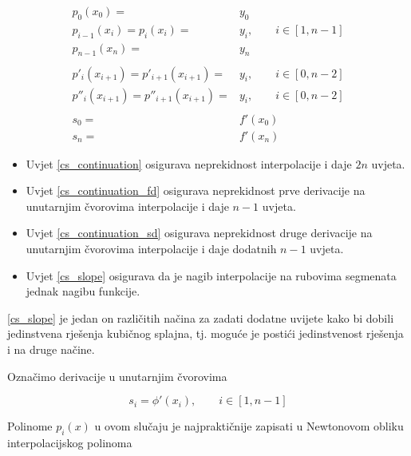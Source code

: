 \begin{conditionbox}
    \begin{align}
        p_0(x_0) =& y_0\nonumber\\
        \label{cs_continuation}
        p_{i-1}(x_i) = p_i(x_i) =& y_i,\qquad i\in[1,n-1]\\
        p_{n-1}(x_n) =& y_n\nonumber\\\nonumber\\
        \label{cs_continuation_fd}
        p'_{i}(x_{i+1}) = p'_{i+1}(x_{i+1}) =& y_i,\qquad i\in[0,n-2]\\
        \label{cs_continuation_sd}
        p''_{i}(x_{i+1}) = p''_{i+1}(x_{i+1}) =& y_i,\qquad i\in[0,n-2]\\\nonumber\\
        s_0=&f'(x_0)\nonumber\\
        \label{cs_slope}
        s_n=&f'(x_n)
    \end{align}

    \begin{itemize}
        \item Uvjet \ref{cs_continuation} osigurava neprekidnost interpolacije i daje $2n$ uvjeta.
        \item Uvjet \ref{cs_continuation_fd} osigurava neprekidnost prve derivacije na unutarnjim čvorovima interpolacije i daje $n-1$ uvjeta.
        \item Uvjet \ref{cs_continuation_sd} osigurava neprekidnost druge derivacije na unutarnjim čvorovima interpolacije i daje dodatnih $n-1$ uvjeta.
        \item Uvjet \ref{cs_slope} osigurava da je nagib interpolacije na rubovima segmenata jednak nagibu funkcije.
    \end{itemize}

    \ref{cs_slope} je jedan on različitih načina za zadati dodatne uvijete kako bi dobili jedinstvena rješenja kubičnog splajna, tj. moguće je postići jedinstvenost rješenja i na druge načine.
\end{conditionbox}

\newpage

Označimo derivacije u unutarnjim čvorovima

\begin{equation*}
s_i=\phi'(x_i),\qquad i\in[1,n-1]
\end{equation*}

Polinome $p_i(x)$ u ovom slučaju je najpraktičnije zapisati u Newtonovom obliku interpolacijskog polinoma

